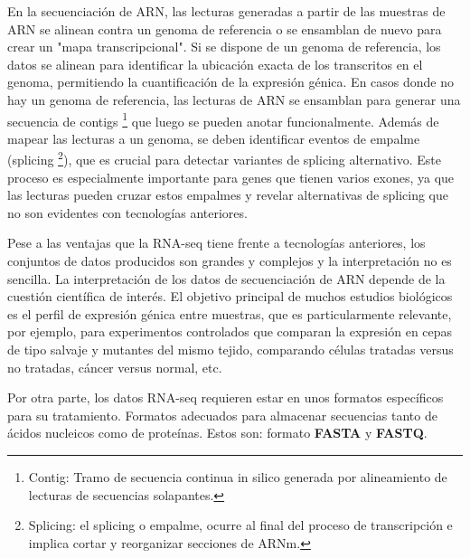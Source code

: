 En la secuenciación de ARN, las lecturas generadas a partir de las muestras de ARN se alinean contra un genoma de referencia o se ensamblan de
nuevo para crear un "mapa transcripcional". Si se dispone de un genoma de referencia, los datos se alinean para identificar la ubicación exacta de
los transcritos en el genoma, permitiendo la cuantificación de la expresión génica. En casos donde no hay un genoma de referencia, las lecturas 
de ARN se ensamblan para generar una secuencia de contigs \footnote[3]{Contig: Tramo de secuencia continua in silico generada por alineamiento 
de lecturas de secuencias solapantes.} que luego se pueden anotar funcionalmente. Además de mapear las lecturas a un genoma, 
se deben identificar eventos de empalme (splicing \footnote[4]{Splicing: el splicing o empalme, ocurre al final del proceso de transcripción e 
implica cortar y reorganizar secciones de ARNm.}), que es crucial para detectar variantes de splicing alternativo. Este proceso es especialmente 
importante para genes que tienen varios exones, ya que las lecturas pueden cruzar estos empalmes y revelar alternativas de splicing que no son 
evidentes con tecnologías anteriores.  %


Pese a las ventajas que la RNA-seq tiene frente a tecnologías anteriores, los conjuntos de datos producidos son grandes y complejos y la interpretación
no es sencilla. La interpretación de los datos de secuenciación de ARN depende de la cuestión científica de interés. El objetivo principal de muchos 
estudios biológicos es el perfil de expresión génica entre muestras, que es particularmente relevante, por ejemplo, para experimentos controlados 
que comparan la expresión en cepas de tipo salvaje y mutantes del mismo tejido, comparando células tratadas versus no tratadas, cáncer versus normal, etc.

Por otra parte, los datos RNA-seq requieren estar en unos formatos específicos para su tratamiento. Formatos adecuados para almacenar secuencias tanto
de ácidos nucleicos como de proteínas. Estos son: formato \textbf{FASTA} y \textbf{FASTQ}.

